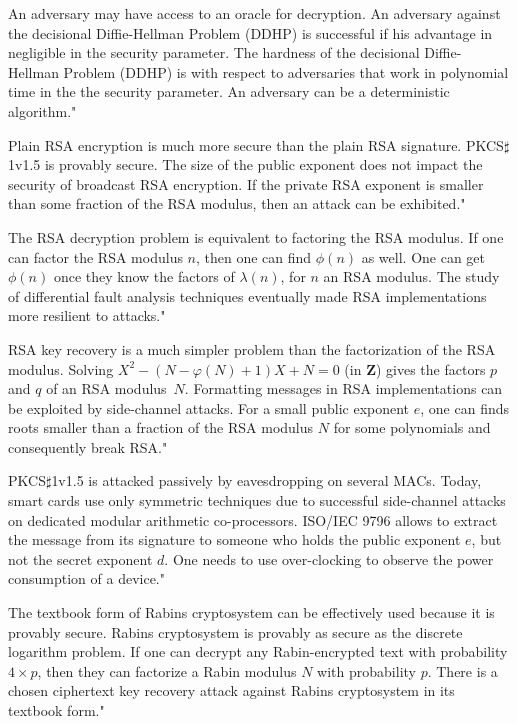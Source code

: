 {An adversary may have access to an oracle for decryption.}
{An adversary against the decisional Diffie-Hellman Problem (DDHP) is successful if his advantage in negligible in the security parameter.}
{The hardness of the decisional Diffie-Hellman Problem (DDHP) is with respect to adversaries that work in polynomial time in the the security parameter.}
{An adversary can be a deterministic algorithm."}

{Plain RSA encryption is much more secure than the plain RSA signature.}
{PKCS$\sharp$1v1.5 is provably secure.}
{The size of the public exponent does not impact the security of broadcast RSA encryption.}
{If the private RSA exponent is smaller than some fraction of the RSA modulus, then an attack can be exhibited."}

{The RSA decryption problem is equivalent to factoring the RSA modulus.}
{If one can factor the RSA modulus $n$, then one can find $\phi(n)$ as well.}
{One can get $\phi(n)$ once they know the factors of $\lambda(n)$, for $n$ an RSA modulus.}
{The study of differential fault analysis techniques eventually made RSA implementations more resilient to attacks."}

{RSA key recovery is a much simpler problem than the factorization of the RSA modulus.}
{Solving $X^2-(N-\varphi(N)+1)X+N=0$ (in $\mathbf{Z}$) gives the factors $p$ and $q$ of an RSA modulus~$N$.}
{Formatting messages in RSA implementations can be exploited by side-channel attacks.}
{For a small public exponent $e$, one can finds roots smaller than a fraction of the RSA modulus $N$ for some polynomials and consequently break RSA."}

{PKCS$\sharp$1v1.5 is attacked passively by eavesdropping on several MACs.}
{Today, smart cards use only symmetric techniques due to successful side-channel attacks on dedicated modular arithmetic co-processors.}
{ISO/IEC 9796 allows to extract the message from its signature to someone who holds the public exponent $e$, but not the secret exponent $d$.}
{One needs to use over-clocking to observe the power consumption of a device."}

{The textbook form of Rabins cryptosystem can be effectively used because it is provably secure.}
{Rabins cryptosystem is provably as secure as the discrete logarithm problem.}
{If one can decrypt any Rabin-encrypted text with probability $4 \times p$, then they can factorize a Rabin modulus $N$ with probability ${p}$.}
{There is a chosen ciphertext key recovery attack against Rabins cryptosystem in its textbook form."}

